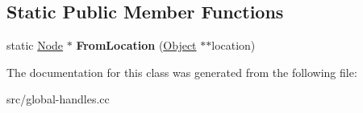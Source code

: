 \subsection*{Static Public Member Functions}
\begin{DoxyCompactItemize}
\item 
\hypertarget{classv8_1_1internal_1_1_global_handles_1_1_node_a96d8edb89864010ec5ce1de5835c8e6f}{}static \hyperlink{classv8_1_1internal_1_1_global_handles_1_1_node}{Node} $\ast$ {\bfseries From\+Location} (\hyperlink{classv8_1_1internal_1_1_object}{Object} $\ast$$\ast$location)\label{classv8_1_1internal_1_1_global_handles_1_1_node_a96d8edb89864010ec5ce1de5835c8e6f}

\end{DoxyCompactItemize}


The documentation for this class was generated from the following file\+:\begin{DoxyCompactItemize}
\item 
src/global-\/handles.\+cc\end{DoxyCompactItemize}
